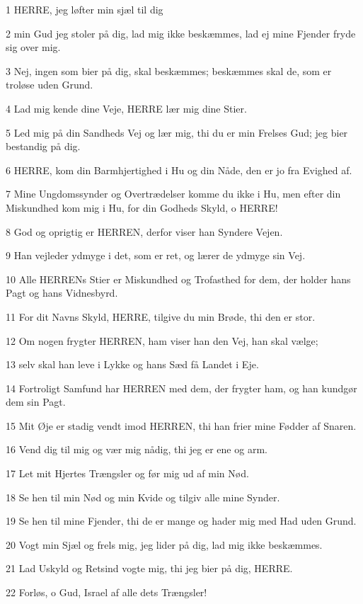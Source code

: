 \par 1 HERRE, jeg løfter min sjæl til dig
\par 2 min Gud jeg stoler på dig, lad mig ikke beskæmmes, lad ej mine Fjender fryde sig over mig.
\par 3 Nej, ingen som bier på dig, skal beskæmmes; beskæmmes skal de, som er troløse uden Grund.
\par 4 Lad mig kende dine Veje, HERRE lær mig dine Stier.
\par 5 Led mig på din Sandheds Vej og lær mig, thi du er min Frelses Gud; jeg bier bestandig på dig.
\par 6 HERRE, kom din Barmhjertighed i Hu og din Nåde, den er jo fra Evighed af.
\par 7 Mine Ungdomssynder og Overtrædelser komme du ikke i Hu, men efter din Miskundhed kom mig i Hu, for din Godheds Skyld, o HERRE!
\par 8 God og oprigtig er HERREN, derfor viser han Syndere Vejen.
\par 9 Han vejleder ydmyge i det, som er ret, og lærer de ydmyge sin Vej.
\par 10 Alle HERRENs Stier er Miskundhed og Trofasthed for dem, der holder hans Pagt og hans Vidnesbyrd.
\par 11 For dit Navns Skyld, HERRE, tilgive du min Brøde, thi den er stor.
\par 12 Om nogen frygter HERREN, ham viser han den Vej, han skal vælge;
\par 13 selv skal han leve i Lykke og hans Sæd få Landet i Eje.
\par 14 Fortroligt Samfund har HERREN med dem, der frygter ham, og han kundgør dem sin Pagt.
\par 15 Mit Øje er stadig vendt imod HERREN, thi han frier mine Fødder af Snaren.
\par 16 Vend dig til mig og vær mig nådig, thi jeg er ene og arm.
\par 17 Let mit Hjertes Trængsler og før mig ud af min Nød.
\par 18 Se hen til min Nød og min Kvide og tilgiv alle mine Synder.
\par 19 Se hen til mine Fjender, thi de er mange og hader mig med Had uden Grund.
\par 20 Vogt min Sjæl og frels mig, jeg lider på dig, lad mig ikke beskæmmes.
\par 21 Lad Uskyld og Retsind vogte mig, thi jeg bier på dig, HERRE.
\par 22 Forløs, o Gud, Israel af alle dets Trængsler!

